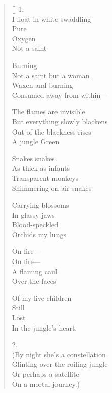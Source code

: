 \label{ch:neardeath}
\settowidth{\versewidth}{My bridal sandals are made of clay}
\begin{verse}[\versewidth]
1.\\
I float in white swaddling\\
Pure\\
Oxygen\\
Not a saint

Burning\\
Not a saint but a woman\\
Waxen and burning\\
Consumed away from within---

The flames are invisible\\
But everything slowly blackens\\
Out of the blackness rises\\
A jungle     Green

Snakes   snakes\\
As thick as infants\\
Transparent monkeys\\
Shimmering on air     snakes

Carrying blossoms\\
In glassy jaws\\
Blood-speckled\\
Orchids     my lungs

On fire---\\
On fire---\\
A flaming caul\\
Over the faces

Of my live children\\
Still\\
Lost\\
In the jungle's heart.



2.\\
(By night she's a constellation\\
Glinting over the roiling jungle\\
Or perhaps a satellite\\
On a mortal journey.)




































\end{verse}
